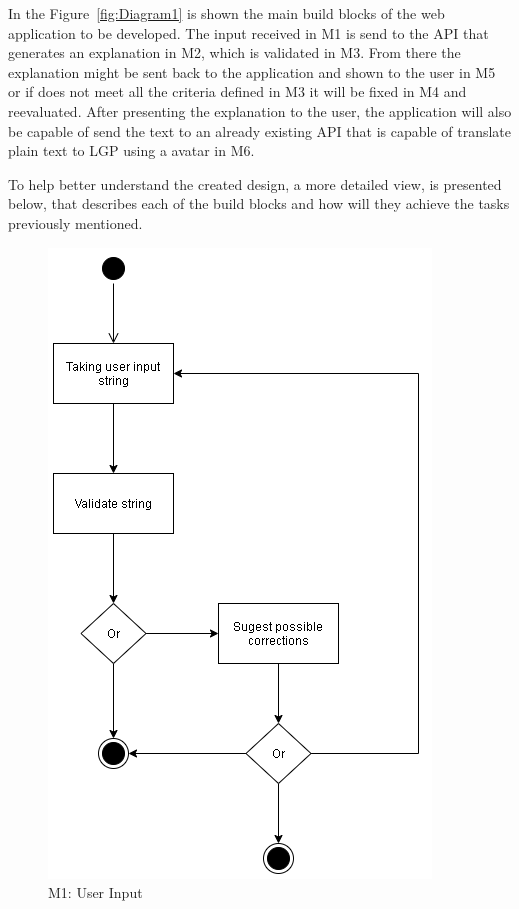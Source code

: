 In the Figure~\ref{fig:Diagram1} is shown the main build blocks of the web application to be developed.
The input received in M1 is send to the \gls{API} that generates an explanation in M2, which is validated in M3.
From there the explanation might be sent back to the application and shown to the user in M5  or if does not meet all the criteria defined in M3 it will be fixed in M4 and reevaluated.
After presenting the explanation to the user, the application will also be capable of send the text to an already existing \gls{API} that is capable of translate plain text to \gls{LGP} using a avatar in M6.

To help better understand the created design, a more detailed view, is presented below, that describes each of the build blocks and how will they achieve the tasks previously mentioned.

\begin{figure}[H]
\centering
\includegraphics[scale=0.5]{ch4/assets/M1.png}
\caption[User Input Module]{M1: User Input}
\label{fig:M1}
\end{figure}

